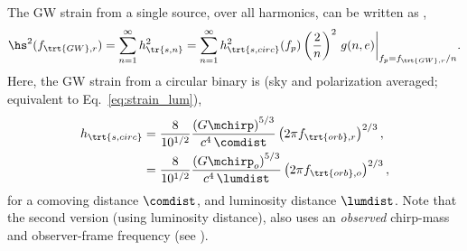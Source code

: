 \documentclass[10pt, oneside, onecolumn]{article}   	%
\newcommand{\hsn}{h_\tr{s,n}}
\newcommand{\hscirc}{h_\trt{s,circ}}
\newcommand{\frstgw}{f_{\trt{GW},r}}
\newcommand{\frstorb}{f_{\trt{orb},r}}
\newcommand{\fobsorb}{f_{\trt{orb},o}}
\begin{document}
            The GW strain from a single source, over all harmonics, can be written as \citep[][Eq.~9]{amaro-seoane2010},
            \begin{equation}
                \label{eq:gw_strain_instant}
                \hs^2(\frstgw) = \sum_{n=1}^\infty \hsn^2 = \sum_{n=1}^\infty \hscirc^2(f_p) \left(\frac{2}{n}\right)^2 \, g(n,e) \bigg|_{f_p = \frstgw/n}.
            \end{equation}
            Here, the GW strain from a circular binary is \citep[][Eq.~7]{sesana2008} (sky and polarization averaged; equivalent to Eq.~\ref{eq:strain_lum}),
            \begin{equation}
            \begin{split}
                \label{eq:gw_strain_amp_circ}
                \hscirc
                    & = \frac{8}{10^{1/2}} \frac{\left(G\mchirp\right)^{5/3}}{c^4 \, \comdist} \left(2 \pi \frstorb \right)^{2/3}, \\
                    & = \frac{8}{10^{1/2}} \frac{\left(G\mchirp_o\right)^{5/3}}{c^4 \, \lumdist} \left(2 \pi \fobsorb \right)^{2/3},
            \end{split}
            \end{equation}
            for a comoving distance $\comdist$, and luminosity distance $\lumdist$.  Note that the second version (using luminosity distance), also uses an \textit{observed} chirp-mass and observer-frame frequency (see ).
\end{document}
